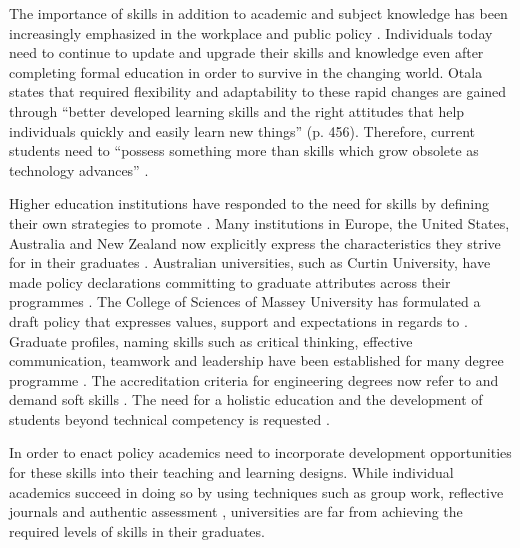
The importance of \LLLs skills in addition to academic and subject knowledge has
been increasingly emphasized in the workplace and public policy
\citep{Morgan-Klein2007,Sutherland2006}. Individuals today need to continue to
update and upgrade their skills and knowledge even after completing formal
education in order to survive in the changing world. Otala
\citeyearpar{Otala1997} states that required flexibility and adaptability to
these rapid changes are gained through ``better developed learning skills and
the right attitudes that help individuals quickly and easily learn new things''
(p. 456). Therefore, current students need to ``possess something more than
skills which grow obsolete as technology advances'' \cite[p.~195]{Field2003}. 

Higher education institutions have responded to the need for \LLLs skills by
defining their own strategies to promote \LLLsn. Many institutions in Europe,
the United States, Australia and New Zealand now explicitly express the \LLLs
characteristics they strive for in their graduates \citep{Scanlon2006}.
Australian universities, such as Curtin University, have made policy
declarations committing to graduate attributes across their programmes
\citep{CurtinUniversity2006}. The College of Sciences of Massey University has
formulated a draft \LLLs policy \citep{MasseyUniversity2008} that expresses
values, support and expectations in regards to \LLLsn. Graduate profiles, naming
\LLLs skills such as critical thinking, effective communication, teamwork and
leadership have been established for many degree programme
\citep{Davies2003,McAlister2003}. The accreditation criteria for engineering
degrees now refer to and demand soft skills \citep{Aller2005,Muffo2001}. The
need for a holistic education and the development of students beyond technical
competency is requested
\citep{Brakke2002,Davies2003,Dowling2006,Fallows2003,Grabowski2004,Hernon2006}.

In order to enact policy academics need to incorporate development opportunities
for these skills into their teaching and learning designs. While individual
academics succeed in doing so by using techniques such as group work, reflective
journals and authentic assessment \citep{Clarke2003,Lombardi2008}, universities
are far from achieving the required levels of \LLLs skills in their graduates.

